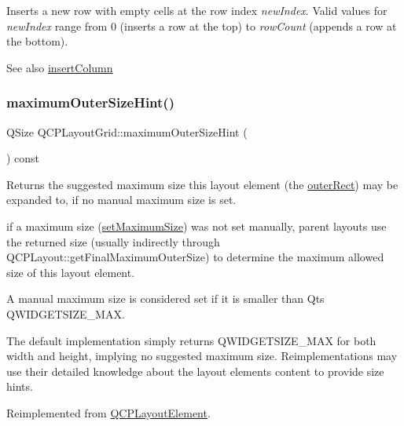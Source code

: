 Inserts a new row with empty cells at the row index {\itshape new\+Index}. Valid values for {\itshape new\+Index} range from 0 (inserts a row at the top) to {\itshape row\+Count} (appends a row at the bottom).

\begin{DoxySeeAlso}{See also}
\hyperlink{classQCPLayoutGrid_a1e880a321dbe8b43b471ccd764433dc4}{insert\+Column} 
\end{DoxySeeAlso}
\mbox{\label{classQCPLayoutGrid_a41ce0014c220d77b909e2ca937f0e599}} 
\subsubsection{\texorpdfstring{maximum\+Outer\+Size\+Hint()}{maximumOuterSizeHint()}}
{\footnotesize\ttfamily Q\+Size Q\+C\+P\+Layout\+Grid\+::maximum\+Outer\+Size\+Hint (\begin{DoxyParamCaption}{ }\end{DoxyParamCaption}) const\hspace{0.3cm}{\ttfamily [virtual]}}

Returns the suggested maximum size this layout element (the \hyperlink{classQCPLayoutElement_a2a32a12a6161c9dffbadeb9cc585510c}{outer\+Rect}) may be expanded to, if no manual maximum size is set.

if a maximum size (\hyperlink{classQCPLayoutElement_a74eb5280a737ab44833d506db65efd95}{set\+Maximum\+Size}) was not set manually, parent layouts use the returned size (usually indirectly through Q\+C\+P\+Layout\+::get\+Final\+Maximum\+Outer\+Size) to determine the maximum allowed size of this layout element.

A manual maximum size is considered set if it is smaller than Qt\textquotesingle{}s {\ttfamily Q\+W\+I\+D\+G\+E\+T\+S\+I\+Z\+E\+\_\+\+M\+AX}.

The default implementation simply returns {\ttfamily Q\+W\+I\+D\+G\+E\+T\+S\+I\+Z\+E\+\_\+\+M\+AX} for both width and height, implying no suggested maximum size. Reimplementations may use their detailed knowledge about the layout element\textquotesingle{}s content to provide size hints. 

Reimplemented from \hyperlink{classQCPLayoutElement_ad96efb977a26e360e8a64a4c1e56456d}{Q\+C\+P\+Layout\+Element}.

